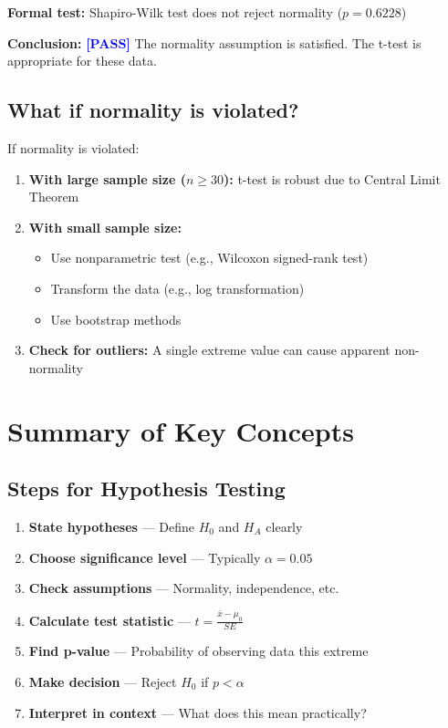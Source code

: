 \documentclass[11pt]{article}
\begin{document}
\textbf{Formal test:} Shapiro-Wilk test does not reject normality ($p = 0.6228$)

\textbf{Conclusion:} \textcolor{blue}{\textbf{[PASS]}} The normality assumption is satisfied. The t-test is appropriate for these data.

\subsection*{What if normality is violated?}

If normality is violated:
\begin{enumerate}
\item \textbf{With large sample size ($n \geq 30$):} t-test is robust due to Central Limit Theorem
\item \textbf{With small sample size:}
   \begin{itemize}
   \item Use nonparametric test (e.g., Wilcoxon signed-rank test)
   \item Transform the data (e.g., log transformation)
   \item Use bootstrap methods
   \end{itemize}
\item \textbf{Check for outliers:} A single extreme value can cause apparent non-normality
\end{enumerate}

\vspace{24pt}

\section*{Summary of Key Concepts}

\subsection*{Steps for Hypothesis Testing}

\begin{enumerate}
\item \textbf{State hypotheses} --- Define $H_0$ and $H_A$ clearly
\item \textbf{Choose significance level} --- Typically $\alpha = 0.05$
\item \textbf{Check assumptions} --- Normality, independence, etc.
\item \textbf{Calculate test statistic} --- $t = \frac{\bar{x} - \mu_0}{SE}$
\item \textbf{Find p-value} --- Probability of observing data this extreme
\item \textbf{Make decision} --- Reject $H_0$ if $p < \alpha$
\item \textbf{Interpret in context} --- What does this mean practically?
\end{enumerate}
\end{document}
